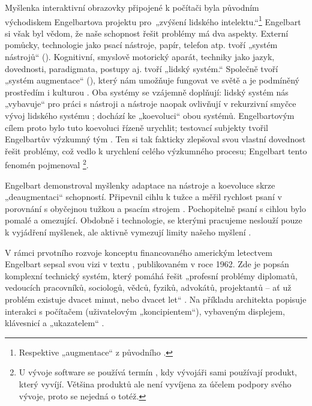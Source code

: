 Myšlenka interaktivní obrazovky připojené k počítači byla původním východiskem Engelbartova projektu pro „zvýšení lidského intelektu.“\footnote{Respektive „augmentace“ z původního .} Engelbart si však byl vědom, že naše schopnost řešit problémy má dva aspekty. Externí pomůcky, technologie jako psací nástroje, papír, telefon atp. tvoří „systém nástrojů“ (). Kognitivní, smyslově motorický aparát, techniky jako jazyk, dovednosti, paradigmata, postupy aj. tvoří „lidský systém.“ Společně tvoří „systém augmentace“ (), který nám umožňuje fungovat ve světě a je podmíněný prostředím i kulturou \autocite{DEI2013}. Oba systémy se vzájemně doplňují: lidský systém nás „vybavuje“ pro práci s nástroji a nástroje naopak ovlivňují v rekurzivní smyčce vývoj lidského systému \autocite[38]{Barnet2014}; dochází ke „koevoluci“ obou systémů. Engelbartovým cílem proto bylo tuto koevoluci řízeně urychlit; testovací subjekty tvořil Engelbartův výzkumný tým \autocite{DEI2013}. Ten si tak fakticky zlepšoval svou vlastní dovednost řešit problémy, což vedlo k urychlení celého výzkumného procesu; Engelbart tento fenomén pojmenoval \footnote{U vývoje software se používá termín , kdy vývojáři sami používají produkt, který vyvíjí. Většina produktů ale není vyvíjena za účelem podpory svého vývoje, proto se nejedná o totéž.}.

Engelbart demonstroval myšlenky adaptace na nástroje a koevoluce skrze „deaugmentaci“ schopností. Připevnil cihlu k tužce a měřil rychlost psaní v porovnání s obyčejnou tužkou a psacím strojem \autocites[47]{Markoff2005}[\pno~2c4m]{Engelbart1962}. Pochopitelně psaní s cihlou bylo pomalé a omezující. Obdobně i technologie, se kterými pracujeme neslouží pouze k vyjádření myšlenek, ale aktivně vymezují limity našeho myšlení \autocite[52]{Barnet2014}.

V rámci prvotního rozvoje konceptu financovaného americkým letectvem Engelbart sepsal svou vizi v textu , publikovaném v roce 1962. Zde je popsán komplexní technický systém, který pomáhá řešit „profesní problémy diplomatů, vedoucích pracovníků, sociologů, vědců, fyziků, advokátů, projektantů -- ať už problém existuje dvacet minut, nebo dvacet let“ \autocite[\pno~1a1]{Engelbart1962}. Na příkladu architekta popisuje interakci s počítačem (uživatelovým „koncipientem“), vybaveným displejem, klávesnicí a „ukazatelem“ \autocite[\ppno~1a11--12]{Engelbart1962}.

